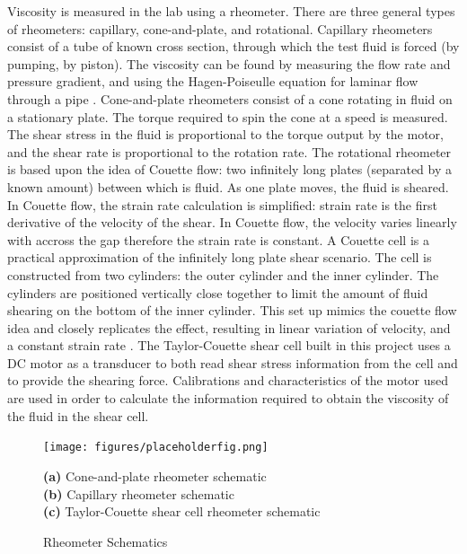 \documentclass[twoside,a4]{report}
\def\br{\newline \newline \noindent}
\begin{document}
	\noindent
	Viscosity is measured in the lab using a rheometer. There are three general types of rheometers: capillary, cone-and-plate, and rotational. Capillary rheometers consist of a tube of known cross section, through which the test fluid is forced (by pumping, by piston). The viscosity can be found by measuring the flow rate and pressure gradient, and using the Hagen-Poiseulle equation for laminar flow through a pipe \cite{backcaprheom}. Cone-and-plate rheometers consist of a cone rotating in fluid on a stationary plate. The torque required to spin the cone at a speed is measured. The shear stress in the fluid is proportional to the torque output by the motor, and the shear rate is proportional to the rotation rate. 
	\br
	The rotational rheometer is based upon the idea of Couette flow: two infinitely long plates (separated by a known amount) between which is fluid. As one plate moves, the fluid is sheared. In Couette flow, the strain rate calculation is simplified: strain rate is the first derivative of the velocity of the shear. In Couette flow, the velocity varies linearly with accross the gap therefore the strain rate is constant. A Couette cell is a practical approximation of the infinitely long plate shear scenario. The cell is constructed from two cylinders: the outer cylinder and the inner cylinder. The cylinders are positioned vertically close together to limit the amount of fluid shearing on the bottom of the inner cylinder. This set up mimics the couette flow idea and closely replicates the effect, resulting in linear variation of velocity, and a constant strain rate \cite{couetteshearcell}.
	\br
	The Taylor-Couette shear cell built in this project uses a DC motor as a transducer to both read shear stress information from the cell and to provide the shearing force. Calibrations and characteristics of the motor used are used in order to calculate the information required to obtain the viscosity of the fluid in the shear cell.
	\begin{figure}[!htb]
		\centering
		\texttt{[image: figures/placeholderfig.png]}
		\caption{Rheometer Schematics}
		\label{figrheomschem}
		\footnotesize 
		\textbf{(a)} Cone-and-plate rheometer schematic\\
		\textbf{(b)} Capillary rheometer schematic\\
		\textbf{(c)} Taylor-Couette shear cell rheometer schematic
	\end{figure}
	
\end{document}
